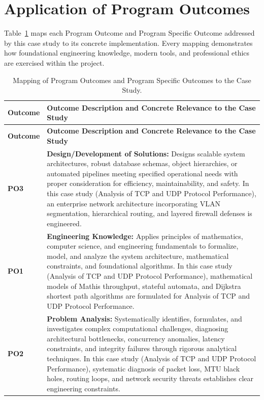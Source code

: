 \section{Application of Program Outcomes}
Table~\ref{tab:po} maps each Program Outcome and Program Specific Outcome addressed by this case study to its concrete implementation. Every mapping demonstrates how foundational engineering knowledge, modern tools, and professional ethics are exercised within the project.

{\small
\begin{longtable}{@{}>{\centering\arraybackslash}p{1.8cm} p{13.2cm}@{}}
    \caption{Mapping of Program Outcomes and Program Specific Outcomes to the Case Study.}\label{tab:po}\\
    \toprule
    \textbf{Outcome} & \textbf{Outcome Description and Concrete Relevance to the Case Study} \\
    \midrule
    \endfirsthead
    \toprule
    \textbf{Outcome} & \textbf{Outcome Description and Concrete Relevance to the Case Study} \\
    \midrule
    \endhead
\textbf{PO3} & \textbf{Design/Development of Solutions:} Designs scalable system architectures, robust database schemas, object hierarchies, or automated pipelines meeting specified operational needs with proper consideration for efficiency, maintainability, and safety. In this case study (Analysis of TCP and UDP Protocol Performance), an enterprise network architecture incorporating VLAN segmentation, hierarchical routing, and layered firewall defenses is engineered. \\
    \addlinespace
\textbf{PO1} & \textbf{Engineering Knowledge:} Applies principles of mathematics, computer science, and engineering fundamentals to formalize, model, and analyze the system architecture, mathematical constraints, and foundational algorithms. In this case study (Analysis of TCP and UDP Protocol Performance), mathematical models of Mathis throughput, stateful automata, and Dijkstra shortest path algorithms are formulated for Analysis of TCP and UDP Protocol Performance. \\
    \addlinespace
\textbf{PO2} & \textbf{Problem Analysis:} Systematically identifies, formulates, and investigates complex computational challenges, diagnosing architectural bottlenecks, concurrency anomalies, latency constraints, and integrity failures through rigorous analytical techniques. In this case study (Analysis of TCP and UDP Protocol Performance), systematic diagnosis of packet loss, MTU black holes, routing loops, and network security threats establishes clear engineering constraints. \\

\end{longtable}}
